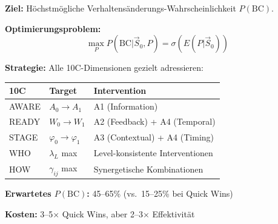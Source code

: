 \begin{tcolorbox}[colback=orange!5!white, colframe=orange!75!black,
    title=\textbf{Archetyp 6: 📈 Maximum Behavior Change Portfolio}]
\textbf{Ziel:} Höchstmögliche Verhaltensänderungs-Wahrscheinlichkeit $P(\text{BC})$.

\textbf{Optimierungsproblem:}
\begin{equation}
\max_{P} P(\text{BC} | \vec{S}_0, P) = \sigma\left( E(P | \vec{S}_0) \right)
\end{equation}

\textbf{Strategie:} Alle 10C-Dimensionen gezielt adressieren:

\begin{center}
\footnotesize
\begin{tabular}{@{}lll@{}}
\toprule
\textbf{10C} & \textbf{Target} & \textbf{Intervention} \\
\midrule
AWARE & $A_0 \to A_1$ & A1 (Information) \\
READY & $W_0 \to W_1$ & A2 (Feedback) + A4 (Temporal) \\
STAGE & $\varphi_0 \to \varphi_1$ & A3 (Contextual) + A4 (Timing) \\
WHO & $\lambda_L$ max & Level-konsistente Interventionen \\
HOW & $\gamma_{ij}$ max & Synergetische Kombinationen \\
\bottomrule
\end{tabular}
\end{center}

\textbf{Erwartetes $P(\text{BC})$:} 45--65\% (vs.\ 15--25\% bei Quick Wins)

\textbf{Kosten:} 3--5× Quick Wins, aber 2--3× Effektivität
\end{tcolorbox}

